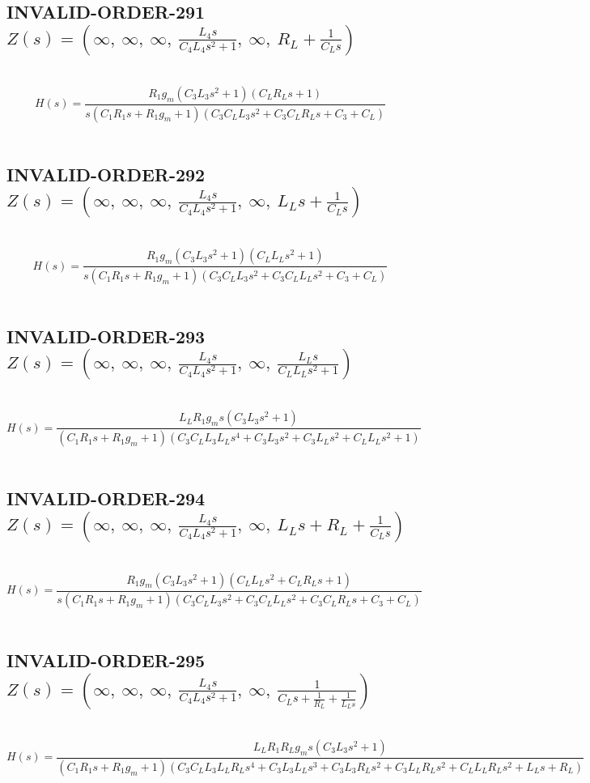 \documentclass{article}
\begin{document}
\subsection{INVALID-ORDER-291 $Z(s) = \left( \infty, \  \infty, \  \infty, \  \frac{L_{4} s}{C_{4} L_{4} s^{2} + 1}, \  \infty, \  R_{L} + \frac{1}{C_{L} s}\right)$ } \ 
\textbf{\[H(s) = \frac{R_{1} g_{m} \left(C_{3} L_{3} s^{2} + 1\right) \left(C_{L} R_{L} s + 1\right)}{s \left(C_{1} R_{1} s + R_{1} g_{m} + 1\right) \left(C_{3} C_{L} L_{3} s^{2} + C_{3} C_{L} R_{L} s + C_{3} + C_{L}\right)}\] } \ 
\subsection{INVALID-ORDER-292 $Z(s) = \left( \infty, \  \infty, \  \infty, \  \frac{L_{4} s}{C_{4} L_{4} s^{2} + 1}, \  \infty, \  L_{L} s + \frac{1}{C_{L} s}\right)$ } \ 
\textbf{\[H(s) = \frac{R_{1} g_{m} \left(C_{3} L_{3} s^{2} + 1\right) \left(C_{L} L_{L} s^{2} + 1\right)}{s \left(C_{1} R_{1} s + R_{1} g_{m} + 1\right) \left(C_{3} C_{L} L_{3} s^{2} + C_{3} C_{L} L_{L} s^{2} + C_{3} + C_{L}\right)}\] } \ 
\subsection{INVALID-ORDER-293 $Z(s) = \left( \infty, \  \infty, \  \infty, \  \frac{L_{4} s}{C_{4} L_{4} s^{2} + 1}, \  \infty, \  \frac{L_{L} s}{C_{L} L_{L} s^{2} + 1}\right)$ } \ 
\textbf{\[H(s) = \frac{L_{L} R_{1} g_{m} s \left(C_{3} L_{3} s^{2} + 1\right)}{\left(C_{1} R_{1} s + R_{1} g_{m} + 1\right) \left(C_{3} C_{L} L_{3} L_{L} s^{4} + C_{3} L_{3} s^{2} + C_{3} L_{L} s^{2} + C_{L} L_{L} s^{2} + 1\right)}\] } \ 
\subsection{INVALID-ORDER-294 $Z(s) = \left( \infty, \  \infty, \  \infty, \  \frac{L_{4} s}{C_{4} L_{4} s^{2} + 1}, \  \infty, \  L_{L} s + R_{L} + \frac{1}{C_{L} s}\right)$ } \ 
\textbf{\[H(s) = \frac{R_{1} g_{m} \left(C_{3} L_{3} s^{2} + 1\right) \left(C_{L} L_{L} s^{2} + C_{L} R_{L} s + 1\right)}{s \left(C_{1} R_{1} s + R_{1} g_{m} + 1\right) \left(C_{3} C_{L} L_{3} s^{2} + C_{3} C_{L} L_{L} s^{2} + C_{3} C_{L} R_{L} s + C_{3} + C_{L}\right)}\] } \ 
\subsection{INVALID-ORDER-295 $Z(s) = \left( \infty, \  \infty, \  \infty, \  \frac{L_{4} s}{C_{4} L_{4} s^{2} + 1}, \  \infty, \  \frac{1}{C_{L} s + \frac{1}{R_{L}} + \frac{1}{L_{L} s}}\right)$ } \ 
\textbf{\[H(s) = \frac{L_{L} R_{1} R_{L} g_{m} s \left(C_{3} L_{3} s^{2} + 1\right)}{\left(C_{1} R_{1} s + R_{1} g_{m} + 1\right) \left(C_{3} C_{L} L_{3} L_{L} R_{L} s^{4} + C_{3} L_{3} L_{L} s^{3} + C_{3} L_{3} R_{L} s^{2} + C_{3} L_{L} R_{L} s^{2} + C_{L} L_{L} R_{L} s^{2} + L_{L} s + R_{L}\right)}\] } \ 
\end{document}
